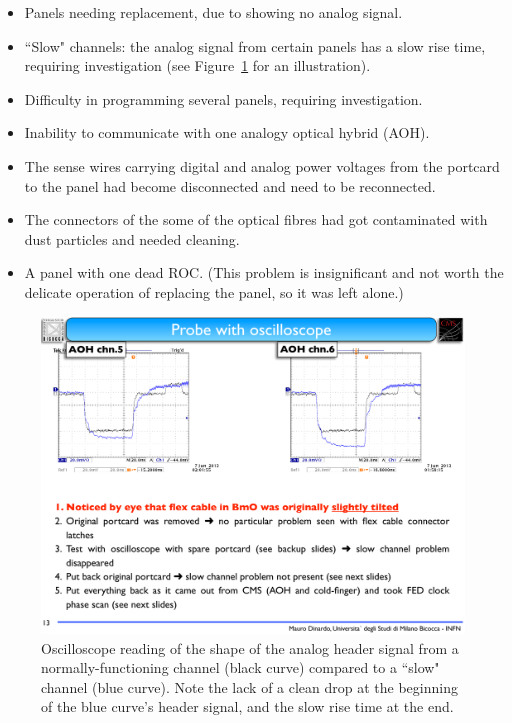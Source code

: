 \begin{itemize}
\item Panels needing replacement, due to showing no analog signal.
\item ``Slow" channels: the analog signal from certain panels has a slow rise time, requiring investigation (see Figure~\ref{fig:fpix-slowchannel} for an illustration).
\item Difficulty in programming several panels, requiring investigation.
\item Inability to communicate with one analogy optical hybrid (AOH).
\item The sense wires carrying digital and analog power voltages from the portcard to the panel had become disconnected and need to be reconnected.
\item The connectors of the some of the optical fibres had got contaminated with dust particles and needed cleaning.
\item A panel with one dead ROC. (This problem is insignificant and not worth the delicate operation of replacing the panel, so it was left alone.)
\end{itemize}

\begin{figure}[hbtp]
  \begin{center}
    \includegraphics[width=1.5\cmsFigWidth]{figures/fpix-slowchannel-scope}
    \caption{Oscilloscope reading of the shape of the analog header signal from a normally-functioning channel (black curve) compared to a ``slow" channel (blue curve). Note the lack of a clean drop at the beginning of the blue curve's header signal, and the slow rise time at the end.}
    \label{fig:fpix-slowchannel}
  \end{center}
\end{figure}

